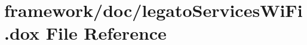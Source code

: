 \hypertarget{legato_services_wi_fi_8dox}{}\section{framework/doc/legato\+Services\+Wi\+Fi.dox File Reference}
\label{legato_services_wi_fi_8dox}
